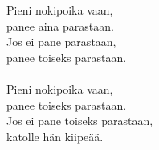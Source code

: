 
            Pieni nokipoika vaan, \\
            panee aina parastaan. \\
            Jos ei pane parastaan, \\
            panee toiseks parastaan. \\
\hspace{10mm} \\
            Pieni nokipoika vaan, \\
            panee toiseks parastaan. \\
            Jos ei pane toiseks parastaan, \\
            katolle hän kiipeää. \\
\hspace{10mm} \\
            \begin{comment} Lisäsäkeistö: \\
\hspace{10mm} \\
            Pieni fuksityttö vaan, \\
            nai fuksivastaavaa. \\
            Jos ei nai fuksivastaavaa, \\
            niin nai puheenjohtajaa. \\
\end{comment}
